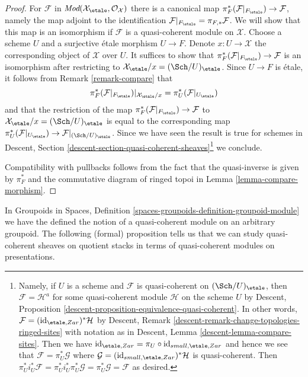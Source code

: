 \begin{proof}
\medskip\noindent
For $\mathcal{F}$ in
$\textit{Mod}(\mathcal{X}_\etale, \mathcal{O}_\mathcal{X})$
there is a canonical map $\pi_F^*(\mathcal{F}|_{F_\etale}) \to \mathcal{F}$,
namely the map adjoint to the identification
$\mathcal{F}|_{F_\etale} = \pi_{F, *}\mathcal{F}$.
We will show that this map is an isomorphism if $\mathcal{F}$ is
a quasi-coherent module on $\mathcal{X}$.
Choose a scheme $U$ and a surjective \'etale morphism $U \to F$.
Denote $x : U \to \mathcal{X}$ the corresponding object of $\mathcal{X}$
over $U$. It suffices to show that
$\pi_F^*(\mathcal{F}|_{F_\etale}) \to \mathcal{F}$ is an isomorphism
after restricting to $\mathcal{X}_\etale/x = (\Sch/U)_\etale$.
Since $U \to F$ is \'etale, it follows from Remark \ref{remark-compare} that
$$
\pi_F^*(\mathcal{F}|_{F_\etale})|_{\mathcal{X}_\etale/x} =
\pi_U^*(\mathcal{F}|_{U_\etale})
$$
and that the restriction of the map
$\pi_F^*(\mathcal{F}|_{F_\etale}) \to \mathcal{F}$
to $\mathcal{X}_\etale/x = (\Sch/U)_\etale$
is equal to the corresponding map
$\pi_U^*(\mathcal{F}|_{U_\etale}) \to \mathcal{F}|_{(\Sch/U)_\etale}$.
Since we have seen the result is true for schemes in
Descent, Section \ref{descent-section-quasi-coherent-sheaves}\footnote{Namely,
if $U$ is a scheme and $\mathcal{F}$ is quasi-coherent on
$(\Sch/U)_\etale$, then $\mathcal{F} = \mathcal{H}^a$ for some
quasi-coherent module $\mathcal{H}$ on the scheme $U$ by
Descent, Proposition \ref{descent-proposition-equivalence-quasi-coherent}.
In other words, $\mathcal{F} = (\text{id}_{\etale,Zar})^*\mathcal{H}$
by Descent, Remark \ref{descent-remark-change-topologies-ringed-sites}
with notation as in Descent, Lemma \ref{descent-lemma-compare-sites}.
Then we have
$\text{id}_{\etale,Zar} = \pi_U \circ \text{id}_{small,\etale,Zar}$
and hence we see that $\mathcal{F} = \pi_U^*\mathcal{G}$ where
$\mathcal{G} = (\text{id}_{small,\etale,Zar})^*\mathcal{H}$ is
quasi-coherent. Then
$\pi_U^*i_U^*\mathcal{F} = \pi_U^*i_U^*\pi_U^*\mathcal{G} =
\pi_U^*\mathcal{G} = \mathcal{F}$ as desired.}
we conclude.

\medskip\noindent
Compatibility with pullbacks follows from the fact that
the quasi-inverse is given by $\pi_F^*$ and the
commutative diagram of ringed topoi in
Lemma \ref{lemma-compare-morphism}.
\end{proof}

\noindent
In
Groupoids in Spaces, Definition
\ref{spaces-groupoids-definition-groupoid-module}
we have the defined the notion of a quasi-coherent module
on an arbitrary groupoid. The following (formal) proposition tells us
that we can study quasi-coherent sheaves on quotient stacks in
terms of quasi-coherent modules on presentations.

